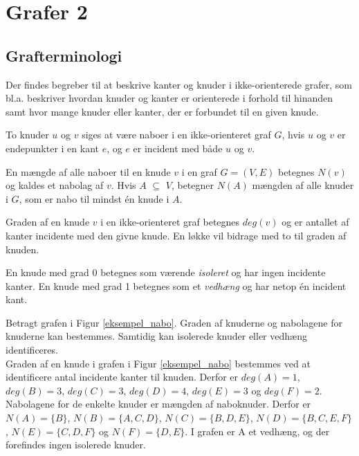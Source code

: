 \usetikzlibrary{arrows, positioning}
\section{Grafer 2}
\subsection{Grafterminologi}

Der findes begreber til at beskrive kanter og knuder i ikke-orienterede grafer, som bl.a. beskriver hvordan knuder og kanter er orienterede i forhold til hinanden samt hvor mange knuder eller kanter, der er forbundet til en given knude.

\begin{defn}
To knuder $u$ og $v$ siges at være naboer i en ikke-orienteret graf $G$, hvis $u$ og $v$ er endepunkter i en kant $e$, og $e$ er incident med både $u$ og $v$.
\end{defn}

\begin{defn}
En mængde af alle naboer til en knude $v$ i en graf $G=(V,E)$ betegnes $N(v)$ og kaldes et nabolag af $v$. Hvis $A$ $\subseteq$ $V$, betegner $N(A)$ mængden af alle knuder i $G$, som er nabo til mindst én knude i $A$.
\end{defn}

\begin{defn}
Graden af en knude $v$ i en ikke-orienteret graf betegnes $deg(v)$ og er antallet af kanter incidente med den givne knude.  En løkke vil bidrage med to til graden af knuden. 
\end{defn}

\noindent En knude med grad 0 betegnes som værende \textit{isoleret} og har ingen incidente kanter. En knude med grad 1 betegnes som et \textit{vedhæng} og har netop én incident kant.

\begin{exmp}
Betragt grafen i Figur \ref{eksempel_nabo}. Graden af knuderne og nabolagene for knuderne kan bestemmes. Samtidig kan isolerede knuder eller vedhæng identificeres.\\
Graden af en knude i grafen i Figur \ref{eksempel_nabo} bestemmes ved at identificere antal incidente kanter til knuden. Derfor er $deg(A)=1$, $deg(B)=3$, $deg(C)=3$, $deg(D)=4$, $deg(E)=3$ og $deg(F)=2$. 
Nabolagene for de enkelte knuder er mængden af naboknuder. 
Derfor er $N(A)=\lbrace B \rbrace$, $N(B)=\lbrace A, C, D \rbrace$, $N(C)=\lbrace B, D, E \rbrace$, $N(D)=\lbrace B, C, E, F \rbrace$, $N(E)=\lbrace C, D, F \rbrace$ og $N(F)=\lbrace D, E \rbrace$. 
I grafen er A et vedhæng, og der forefindes ingen isolerede knuder.
\end{exmp}

